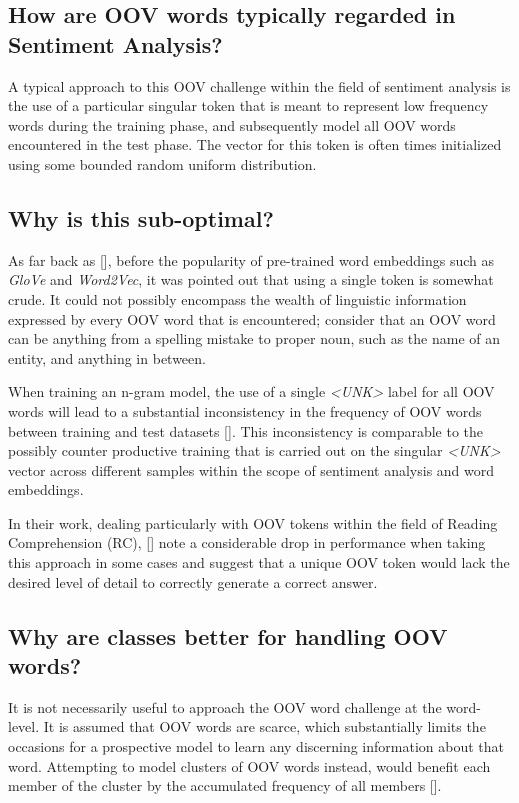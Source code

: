 \documentclass[12pt, a4paper]{report}
\newcommand{\unk}{\textit{\textless{UNK}\textgreater} }
\theoremstyle{definition}
\theoremstyle{definition}%
\theoremstyle{definition}%
\theoremstyle{definition}%
\theoremstyle{definition}%
\theoremstyle{definition}%
\renewcommand{\cite}[1]{[\citealp{#1}]}
\begin{document}
\subsection{How are OOV words typically regarded in Sentiment Analysis?}
A typical approach to this OOV challenge within the field of sentiment analysis is the use of a particular singular token that is meant to represent low frequency words during the training phase, and subsequently model all OOV words encountered in the test phase. The vector for this token is often times initialized using some bounded random uniform distribution.

\subsection{Why is this sub-optimal?}
As far back as \cite{gallwitz1996}, before the popularity of pre-trained word embeddings such as \textit{GloVe} and \textit{Word2Vec}, it was pointed out that using a single token is somewhat crude. It could not possibly encompass the wealth of linguistic information expressed by every OOV word that is encountered; consider that an OOV word can be anything from a spelling mistake to proper noun, such as the name of an entity, and anything in between.  

When training an n-gram model, the use of a single \unk label for all OOV words will lead to a substantial inconsistency in the frequency of OOV words between training and test datasets \cite{gallwitz1996}. This inconsistency is comparable to the possibly counter productive training that is carried out on the singular \unk vector across different samples within the scope of sentiment analysis and word embeddings.

In their work, dealing particularly with OOV tokens within the field of Reading Comprehension (RC), \cite{bhuwandhingra2017} note a considerable drop in performance when taking this approach in some cases and suggest that a unique OOV token would lack the desired level of detail to correctly generate a correct answer. 

\subsection{Why are classes better for handling OOV words?}
It is not necessarily useful to approach the OOV word challenge at the word-level. It is assumed that OOV words are scarce, which substantially limits the occasions for a prospective model to learn any discerning information about that word. Attempting to model clusters of OOV words instead, would benefit each member of the cluster by the accumulated frequency of all members \cite{naptali2012}.
\end{document}
